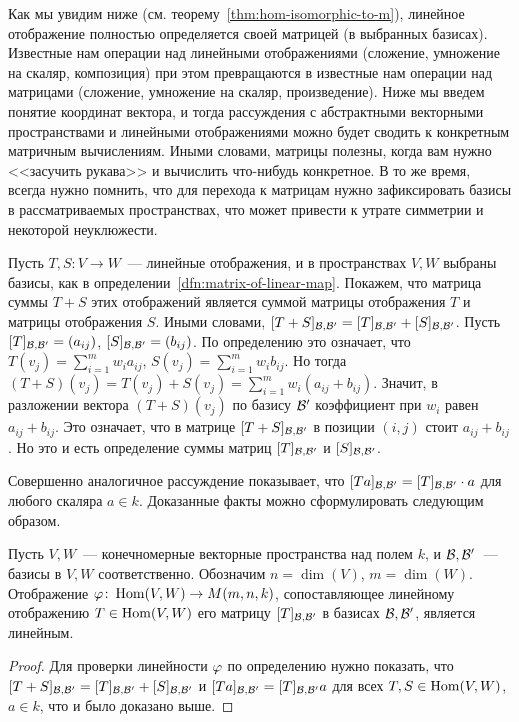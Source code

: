 Как мы увидим ниже (см. теорему~\ref{thm:hom-isomorphic-to-m}),
линейное отображение полностью определяется
своей матрицей (в выбранных базисах). Известные нам операции
над линейными отображениями (сложение, умножение на скаляр,
композиция) при этом превращаются в известные
нам операции над матрицами (сложение, умножение на скаляр,
произведение). Ниже мы введем понятие координат вектора,
и тогда рассуждения с абстрактными векторными пространствами
и линейными отображениями можно будет сводить к конкретным
матричным вычислениям. Иными словами, матрицы полезны, когда
вам нужно <<засучить рукава>> и вычислить что-нибудь конкретное.
В то же время, всегда нужно помнить, что для перехода к матрицам
нужно зафиксировать базисы в рассматриваемых пространствах,
что может привести к утрате симметрии и некоторой неуклюжести.

Пусть $T,S\colon V\to W$~--- линейные отображения, и
в пространствах $V,W$ выбраны базисы, как в
определении~\ref{dfn:matrix-of-linear-map}.
Покажем, что матрица суммы $T+S$ этих отображений
является суммой матрицы отображения $T$ и матрицы отображения $S$.
Иными словами, $[T+S]_{\mathcal B,\mathcal B'} = [T]_{\mathcal B,\mathcal B'}
+ [S]_{\mathcal B,\mathcal B'}$.
Пусть $[T]_{\mathcal B,\mathcal B'} = (a_{ij})$, 
$[S]_{\mathcal B,\mathcal B'} = (b_{ij})$.
По определению это означает, что
$T(v_j) = \sum_{i=1}^m w_ia_{ij}$,
$S(v_j) = \sum_{i=1}^m w_ib_{ij}$.
Но тогда $(T+S)(v_j) = T(v_j) + S(v_j)
= \sum_{i=1}^m w_i(a_{ij}+b_{ij})$.
Значит, в разложении вектора $(T+S)(v_j)$ по базису $\mathcal B'$
коэффициент при $w_i$ равен $a_{ij}+b_{ij}$.
Это означает, что в матрице $[T+S]_{\mathcal B,\mathcal B'}$
в позиции $(i,j)$ стоит $a_{ij} + b_{ij}$.
Но это и есть определение суммы матриц $[T]_{\mathcal B,\mathcal B'}$
и $[S]_{\mathcal B,\mathcal B'}$.

Совершенно аналогичное рассуждение показывает, что
$[Ta]_{\mathcal B,\mathcal B'} = [T]_{\mathcal B,\mathcal B'}\cdot a$ для
любого скаляра $a\in k$.
Доказанные факты можно сформулировать следующим образом.
\begin{theorem}\label{thm:taking-matrix-is-linear}
Пусть $V,W$~--- конечномерные векторные пространства над полем $k$,
и $\mathcal B,\mathcal B'$~--- базисы в $V,W$ соответственно.
Обозначим $n=\dim(V)$, $m=\dim(W)$.
Отображение $\varphi\colon \operatorname{Hom}(V,W) \to M(m,n,k)$, сопоставляющее
линейному отображению $T\in\operatorname{Hom}(V,W)$ его матрицу
$[T]_{\mathcal B,\mathcal B'}$ в базисах $\mathcal B,\mathcal B'$, является линейным.
\end{theorem}
\begin{proof}
Для проверки линейности $\varphi$ по определению нужно показать,
что $[T+S]_{\mathcal B,\mathcal B'} = [T]_{\mathcal B,\mathcal B'} + [S]_{\mathcal B,\mathcal B'}$
и $[Ta]_{\mathcal B,\mathcal B'} = [T]_{\mathcal B,\mathcal B'}a$ для всех
$T,S\in\operatorname{Hom}(V,W)$, $a\in k$, что и было доказано выше.
\end{proof}

